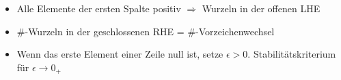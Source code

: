 \begin{tcolorbox}[colback=white!10!white,colframe=green!30!black,title=Routh Kriterium]
	\begin{itemize}
		\item Alle Elemente der ersten Spalte positiv $\Rightarrow$ Wurzeln in der offenen LHE				
		\item $\#$-Wurzeln  in der geschlossenen RHE   = $\#$-Vorzeichenwechsel 
		\item Wenn das erste Element einer Zeile null ist, setze $\epsilon > 0$. Stabilitätskriterium für $\epsilon \rightarrow 0_+$
	\end{itemize}
\end{tcolorbox}
